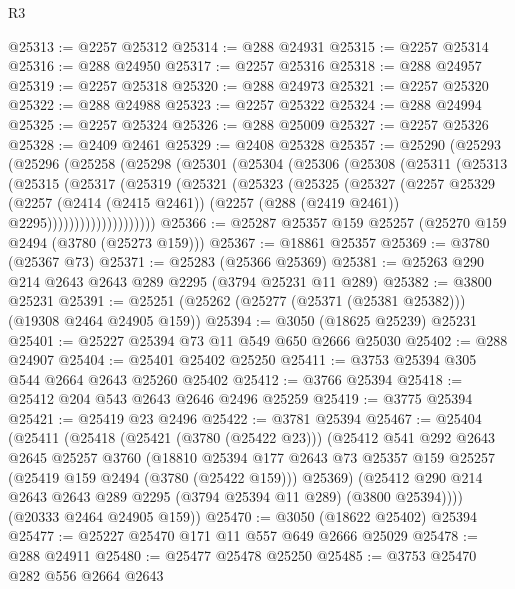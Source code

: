 \begin{lexlean}{R3}
\begin{coremodule}
@25313 := @2257 @25312
@25314 := @288 @24931
@25315 := @2257 @25314
@25316 := @288 @24950
@25317 := @2257 @25316
@25318 := @288 @24957
@25319 := @2257 @25318
@25320 := @288 @24973
@25321 := @2257 @25320
@25322 := @288 @24988
@25323 := @2257 @25322
@25324 := @288 @24994
@25325 := @2257 @25324
@25326 := @288 @25009
@25327 := @2257 @25326
@25328 := @2409 @2461
@25329 := @2408 @25328
@25357 := @25290
    (@25293
      (@25296
        (@25258
          (@25298
            (@25301
              (@25304
                (@25306
                  (@25308
                    (@25311
                      (@25313
                        (@25315
                          (@25317
                            (@25319
                              (@25321
                                (@25323
                                  (@25325
                                    (@25327
                                      (@2257
                                        @25329
                                        (@2257
                                          (@2414 (@2415 @2461))
                                          (@2257 (@288 (@2419 @2461)) @2295))))))))))))))))))))
@25366 := @25287 @25357 @159 @25257 (@25270 @159 @2494 (@3780 (@25273 @159)))
@25367 := @18861 @25357
@25369 := @3780 (@25367 @73)
@25371 := @25283 (@25366 @25369)
@25381 := @25263 @290 @214 @2643 @2643 @289 @2295 (@3794 @25231 @11 @289)
@25382 := @3800 @25231
@25391 := @25251 (@25262 (@25277 (@25371 (@25381 @25382))) (@19308 @2464 @24905 @159))
@25394 := @3050 (@18625 @25239) @25231
@25401 := @25227 @25394 @73 @11 @549 @650 @2666 @25030
@25402 := @288 @24907
@25404 := @25401 @25402 @25250
@25411 := @3753 @25394 @305 @544 @2664 @2643 @25260 @25402
@25412 := @3766 @25394
@25418 := @25412 @204 @543 @2643 @2646 @2496 @25259
@25419 := @3775 @25394
@25421 := @25419 @23 @2496
@25422 := @3781 @25394
@25467 := @25404
    (@25411
      (@25418
        (@25421 (@3780 (@25422 @23)))
        (@25412
          @541
          @292
          @2643
          @2645
          @25257
          @3760
          (@18810
            @25394
            @177
            @2643
            @73
            @25357
            @159
            @25257
            (@25419 @159 @2494 (@3780 (@25422 @159)))
            @25369)
          (@25412 @290 @214 @2643 @2643 @289 @2295 (@3794 @25394 @11 @289) (@3800 @25394))))
      (@20333 @2464 @24905 @159))
@25470 := @3050 (@18622 @25402) @25394
@25477 := @25227 @25470 @171 @11 @557 @649 @2666 @25029
@25478 := @288 @24911
@25480 := @25477 @25478 @25250
@25485 := @3753 @25470 @282 @556 @2664 @2643

\end{coremodule}
\end{lexlean}
